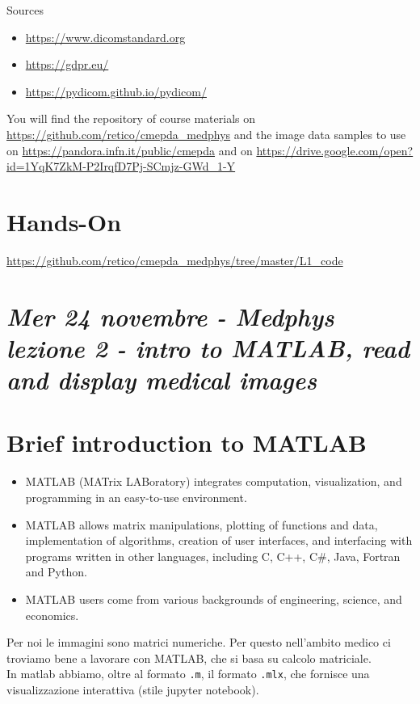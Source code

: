 Sources
\begin{itemize}
	\item \url{https://www.dicomstandard.org}
	\item \url{https://gdpr.eu/}
	\item\url{https://pydicom.github.io/pydicom/}
\end{itemize}

You will find the repository of course materials on \url{https://github.com/retico/cmepda_medphys}
and the image data samples to use on \url{https://pandora.infn.it/public/cmepda}
and on \url{https://drive.google.com/open?id=1YqK7ZkM-P2IrqfD7Pj-SCmjz-GWd_1-Y}

\section{Hands-On}

\url{https://github.com/retico/cmepda_medphys/tree/master/L1_code}

\newpage

\section{\textit{Mer 24 novembre - Medphys lezione 2 - intro to MATLAB, read and display medical images}}

\section{Brief introduction to MATLAB}

\begin{itemize}
	\item MATLAB (MATrix LABoratory) integrates computation, visualization, and 	programming in an easy-to-use environment.
	\item MATLAB allows matrix manipulations, plotting of functions and data, implementation of algorithms, creation of user interfaces, and interfacing with
	programs written in other languages, including C, C++, C\#, Java, Fortran and Python.
	\item MATLAB users come from various backgrounds of engineering, science,
	and economics.
\end{itemize}

Per noi le immagini sono matrici numeriche. Per questo nell'ambito medico ci troviamo bene a lavorare con MATLAB, che si basa su calcolo matriciale.\\

In matlab abbiamo, oltre al formato \texttt{.m}, il formato \texttt{.mlx}, che fornisce una visualizzazione interattiva (stile jupyter notebook).

